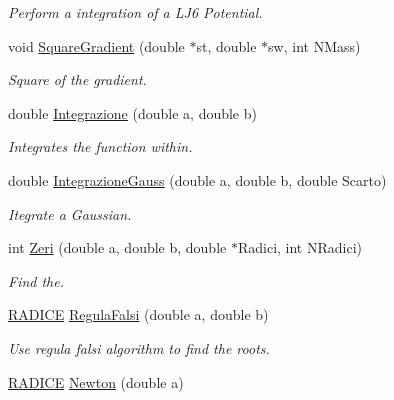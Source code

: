 \begin{DoxyCompactItemize}
\begin{DoxyCompactList}\small\item\em Perform a integration of a L\+J6 Potential. \end{DoxyCompactList}\item 
void \hyperlink{classMatematica_a150471024129f85823beffb064c4df19}{Square\+Gradient} (double $\ast$st, double $\ast$sw, int N\+Mass)\hypertarget{classMatematica_a150471024129f85823beffb064c4df19}{}\label{classMatematica_a150471024129f85823beffb064c4df19}

\begin{DoxyCompactList}\small\item\em Square of the gradient. \end{DoxyCompactList}\item 
double \hyperlink{classMatematica_ac1a876ecf4d7f14cc38a7add8f6ba984}{Integrazione} (double a, double b)
\begin{DoxyCompactList}\small\item\em Integrates the function within. \end{DoxyCompactList}\item 
double \hyperlink{classMatematica_a5382dfb3aa67420d9fbd6619c1aa7796}{Integrazione\+Gauss} (double a, double b, double Scarto)\hypertarget{classMatematica_a5382dfb3aa67420d9fbd6619c1aa7796}{}\label{classMatematica_a5382dfb3aa67420d9fbd6619c1aa7796}

\begin{DoxyCompactList}\small\item\em Itegrate a Gaussian. \end{DoxyCompactList}\item 
int \hyperlink{classMatematica_af1e1e5332753626f39db69dca411ecfc}{Zeri} (double a, double b, double $\ast$Radici, int N\+Radici)
\begin{DoxyCompactList}\small\item\em Find the. \end{DoxyCompactList}\item 
\hyperlink{structRADICE}{R\+A\+D\+I\+CE} \hyperlink{classMatematica_a5b8fbf8c761f9756710aeed5caed4c5e}{Regula\+Falsi} (double a, double b)\hypertarget{classMatematica_a5b8fbf8c761f9756710aeed5caed4c5e}{}\label{classMatematica_a5b8fbf8c761f9756710aeed5caed4c5e}

\begin{DoxyCompactList}\small\item\em Use regula falsi algorithm to find the roots. \end{DoxyCompactList}\item 
\hyperlink{structRADICE}{R\+A\+D\+I\+CE} \hyperlink{classMatematica_a721bd6eae0ff0aa70b8b37327b084e78}{Newton} (double a)\hypertarget{classMatematica_a721bd6eae0ff0aa70b8b37327b084e78}{}\label{classMatematica_a721bd6eae0ff0aa70b8b37327b084e78}


\end{DoxyCompactItemize}
